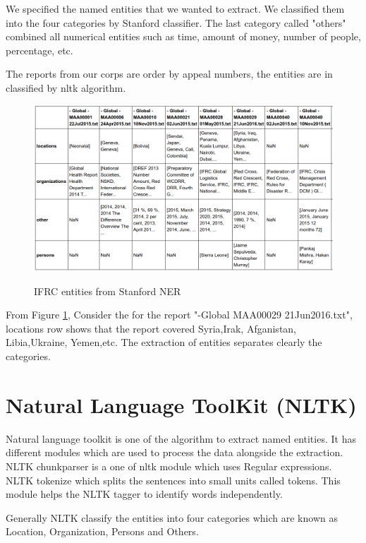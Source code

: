 We specified the named entities that we wanted to extract. We classified them into the four categories by Stanford classifier.  The last category called "others" combined all numerical entities such as time, amount of money, number of people, percentage, etc. 

The reports from our corps are order by appeal numbers, the entities are in classified by nltk algorithm. 



\begin{figure}[hbtp]
\caption{IFRC entities from Stanford NER}
\centering\includegraphics[scale =.45]{images/stanford.png} \label{stanford}
\end{figure}
From Figure \ref{stanford},  Consider the for the report "-Global MAA00029 21Jun2016.txt", locations row  shows that the report covered Syria,Irak, Afganistan, Libia,Ukraine, Yemen,etc.
The extraction of entities separates clearly the categories.
\section{Natural Language ToolKit (NLTK)}
Natural language toolkit is one of the algorithm to extract named  entities. It has different modules which are used to process the data alongside the extraction.
NLTK chunkparser is a one of nltk module  which uses Regular expressions. NLTK tokenize which splits the sentences into small units called tokens. This module helps the NLTK tagger to identify words independently. 

Generally NLTK classify the entities into four categories which are known as Location, Organization, Persons and Others. 


